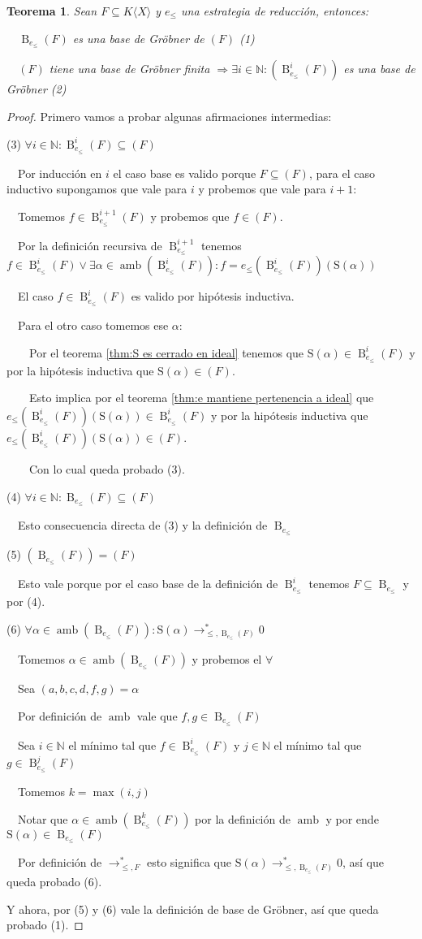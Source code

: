 \documentclass{amsbook}
\theoremstyle{customstyle}
\newtheorem{theorem}{Teorema}[section]
\DeclareMathOperator{\amb}{amb}
\renewcommand{\S}{\text{S}}
\DeclareMathOperator{\B}{B}
\begin{document}
\begin{theorem}
Sean $F ⊆ K⟨X⟩$ y $e_≤$ una estrategia de reducción, entonces:

  $\B_{e_≤}(F)$ es una base de Gröbner de $(F)$ (1)

  $(F)$ tiene una base de Gröbner finita $⇒ ∃i ∈ ℕ : (\B_{e_≤}^i(F))$ es una base de Gröbner (2)
\end{theorem}
\begin{proof}
Primero vamos a probar algunas afirmaciones intermedias:

(3) $∀i ∈ ℕ : \B_{e_≤}^{i}(F) ⊆ (F)$

  Por inducción en $i$ el caso base es valido porque $F ⊆ (F)$, para el caso inductivo supongamos que vale para $i$ y probemos que vale para $i + 1$:

  Tomemos $f ∈ \B_{e_≤}^{i + 1}(F)$ y probemos que $f ∈ (F)$.

  Por la definición recursiva de $\B_{e_≤}^{i + 1}$ tenemos $f ∈ \B_{e_≤}^i(F) ∨ ∃α ∈ \amb(\B_{e_≤}^i(F)) : f = e_≤(\B_{e_≤}^i(F))(\S(α))$

  El caso $f ∈ \B_{e_≤}^i(F)$ es valido por hipótesis inductiva.

  Para el otro caso tomemos ese $α$:

    Por el teorema \ref{thm:S es cerrado en ideal} tenemos que $\S(α) ∈ \B_{e_≤}^i(F)$ y por la hipótesis inductiva que $\S(α) ∈ (F)$.

    Esto implica por el teorema \ref{thm:e mantiene pertenencia a ideal} que $e_≤(\B_{e_≤}^i(F))(\S(α)) ∈ \B_{e_≤}^i(F)$ y por la hipótesis inductiva que $e_≤(\B_{e_≤}^i(F))(\S(α)) ∈ (F)$.

    Con lo cual queda probado (3).

(4) $∀i ∈ ℕ : \B_{e_≤}(F) ⊆ (F)$

  Esto consecuencia directa de (3) y la definición de $\B_{e_≤}$

(5) $(\B_{e_≤}(F)) = (F)$

  Esto vale porque por el caso base de la definición de $\B_{e_≤}^i$ tenemos $F ⊆ \B_{e_≤}$ y por (4).

(6) $∀α ∈ \amb(\B_{e_≤}(F)) : \S(α) →^*_{≤, \B_{e_≤}(F)} 0$

  Tomemos $α ∈ \amb(\B_{e_≤}(F))$ y probemos el $∀$

  Sea $(a, b, c, d, f, g) = α$

  Por definición de $\amb$ vale que $f, g ∈ \B_{e_≤}(F)$

  Sea $i ∈ ℕ$ el mínimo tal que $f ∈ \B_{e_≤}^i(F)$ y $j ∈ ℕ$ el mínimo tal que $g ∈ \B_{e_≤}^j(F)$

  Tomemos $k = \max(i, j)$

  Notar que $α ∈ \amb(\B_{e_≤}^k(F))$ por la definición de $\amb$ y por ende $\S(α) ∈ \B_{e_≤}(F)$

  Por definición de $→^*_{≤, F}$ esto significa que $\S(α) →^*_{≤, \B_{e_≤}(F)} 0$, así que queda probado (6).

Y ahora, por (5) y (6) vale la definición de base de Gröbner, así que queda probado (1).


\end{proof}
\end{document}
